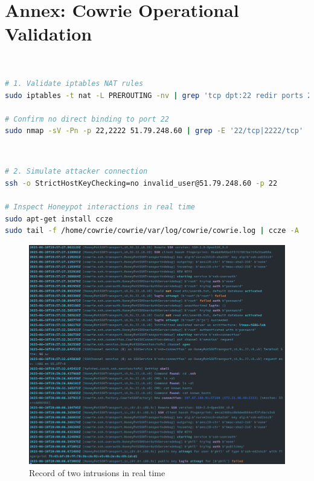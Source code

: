 \section{Annex: Cowrie Operational Validation}  
\label{annex:cowrie-validation}  
\
\
\begin{lstlisting}[language=bash,label={lst:cowrie-redirect},caption={Traffic Redirection Verification}]  
# 1. Validate iptables NAT rules  
sudo iptables -t nat -L PREROUTING -nv | grep 'tcp dpt:22 redir ports 2222'  

# Confirm no direct binding to port 22  
sudo nmap -sV -Pn -p 22,2222 51.79.248.60 | grep -E '22/tcp|2222/tcp'  
\end{lstlisting}  
\
\begin{lstlisting}[language=bash,label={lst:cowrie-access},caption={Honeypot Engagement Testing}]  
# 2. Simulate attacker connection  
ssh -o StrictHostKeyChecking=no invalid_user@51.79.248.60 -p 22  

# Inspect Honeypot interactions in real time  
sudo apt-get install ccze
sudo tail -f /home/cowrie/cowrie/var/log/cowrie/cowrie.log | ccze -A  
\end{lstlisting}  
\begin{figure}[h!]
    \centering
    \includegraphics[width=1\linewidth]{doc/img/annex_c_listing_2.png}
    \caption*{Record of two intrusions in real time}
\end{figure}

\



\newpage




